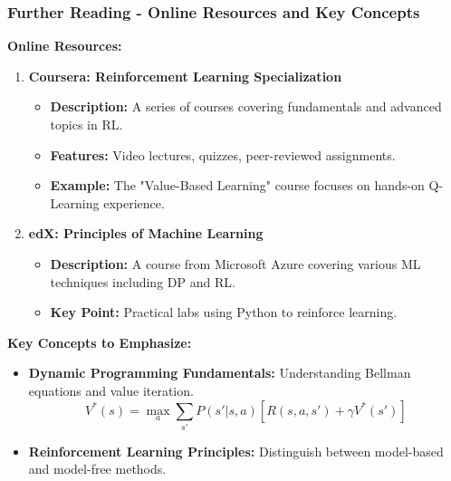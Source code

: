 \documentclass[aspectratio=169]{beamer}
\begin{document}
\begin{frame}[fragile]
    \frametitle{Further Reading - Online Resources and Key Concepts}
    
    \textbf{Online Resources:}
    \begin{enumerate}
        \item \textbf{Coursera: Reinforcement Learning Specialization}
        \begin{itemize}
            \item \textbf{Description:} A series of courses covering fundamentals and advanced topics in RL.
            \item \textbf{Features:} Video lectures, quizzes, peer-reviewed assignments.
            \item \textbf{Example:} The "Value-Based Learning" course focuses on hands-on Q-Learning experience.
        \end{itemize}

        \item \textbf{edX: Principles of Machine Learning}
        \begin{itemize}
            \item \textbf{Description:} A course from Microsoft Azure covering various ML techniques including DP and RL.
            \item \textbf{Key Point:} Practical labs using Python to reinforce learning.
        \end{itemize}
    \end{enumerate}

    \textbf{Key Concepts to Emphasize:}
    \begin{itemize}
        \item \textbf{Dynamic Programming Fundamentals:} Understanding Bellman equations and value iteration.
        \begin{equation}
            V^*(s) = \max_a \sum_{s'} P(s'|s, a) [R(s, a, s') + \gamma V^*(s')]
        \end{equation}
        \item \textbf{Reinforcement Learning Principles:} Distinguish between model-based and model-free methods.
    \end{itemize}
\end{frame}
\end{document}
